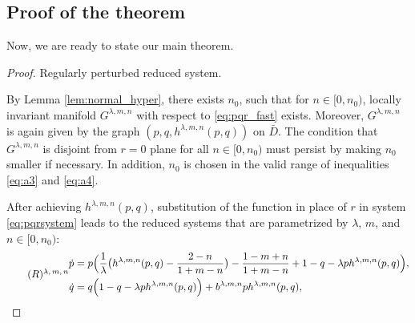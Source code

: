 \documentclass[a4paper,11pt]{article}
\begin{document}
\subsection{Proof of the theorem} \label{sec:proof_proof}

Now, we are ready to state our main theorem.


\smallskip
\noindent
\begin{proof}
\medskip {}
 Regularly perturbed reduced system.
\medskip

By Lemma \ref{lem:normal_hyper}, there exists $n_0$, such that for $n \in [0, n_0)$, locally invariant manifold $G^{\lambda,m,n}$ with respect to \eqref{eq:pqr_fast} exists. Moreover,   $G^{\lambda,m,n}$ is again given by the graph $(p,q,h^{\lambda,m,n}(p,q))$ on $\bar{D}$. The condition that $G^{\lambda,m,n}$ is disjoint from $r=0$ plane for all $n \in [0, n_0)$ must persist by making $n_0$ smaller if necessary. In addition, $n_0$ is chosen in the valid range of inequalities \eqref{eq:a3} and \eqref{eq:a4}.%

After achieving $h^{\lambda,m,n}(p,q)$, substitution of the function in place of $r$ in system \eqref{eq:pqrsystem} leads to  the reduced systems that are parametrized by $\lambda$, $m$, and $n\in[0,n_0)$:
{\small
\begin{equation} \tag*{(${R}$)\textsuperscript{$\lambda,m,n$}} \label{eq:reduced}
\begin{split}
 \dot{p} &=p\Big(\frac{1}{ \lambda }\big(h^{\lambda,m,n}(p,q) - \frac{2-n}{1+m-n}\big) - \frac{1-m+n}{1+m-n} + 1-q- \lambda p h^{\lambda,m,n}(p,q)\Big),\\
 \dot{q} &=q\Big(                                                                          1-q- \lambda p h^{\lambda,m,n}(p,q)\Big) + b^{\lambda,m,n}ph^{\lambda,m,n}(p,q),
\end{split}
\end{equation}
}


\end{proof}
\end{document}
